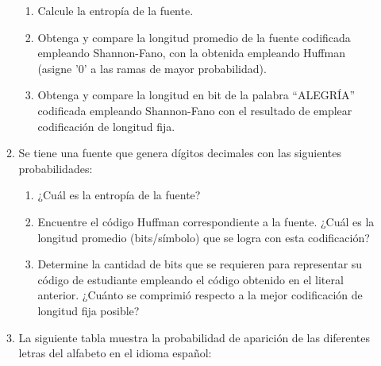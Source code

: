 \begin{enumerate}
\begin{enumerate}
	
	
	\begin{enumerate}
		\item Calcule la entropía de la fuente.
		
		\item Obtenga y compare la longitud promedio de la fuente codificada empleando Shannon-Fano, con la obtenida empleando Huffman (asigne '0' a las ramas de mayor probabilidad).
		
		\item Obtenga y compare la longitud en bit de la palabra ``ALEGRÍA'' codificada empleando Shannon-Fano con el resultado de emplear codificación de longitud fija.
		
		
	\end{enumerate}
	\item  Se tiene una fuente que genera dígitos decimales con las siguientes probabilidades:
	
    \begin{table}[h]
		\captionsetup{justification = raggedright,singlelinecheck = false}
		\caption{Ejercicio tres.}
        \label{tabla:tabla16}
        \centering
\end{table}
	
	
	\begin{enumerate}
		\item  ¿Cuál es la entropía de la fuente?
		\item Encuentre el código Huffman correspondiente a la fuente. ¿Cuál es la longitud promedio (bits/símbolo) que se logra con esta codificación? 
		\item Determine la cantidad de bits que se requieren para representar su código de estudiante empleando el código obtenido en el literal anterior. ¿Cuánto se comprimió respecto a la mejor codificación de longitud fija posible? 
	\end{enumerate}
	\item La siguiente tabla muestra la probabilidad de aparición de las diferentes letras del alfabeto en el idioma español:
	

\end{enumerate}
\end{enumerate}
